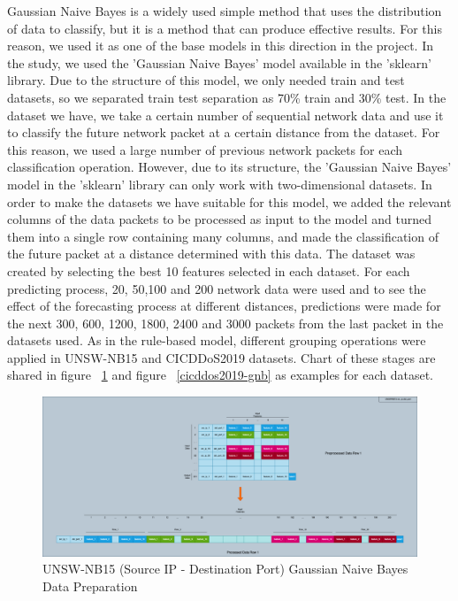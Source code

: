 \documentclass{article}
\begin{document}
Gaussian Naive Bayes is a widely used simple method that uses the distribution of data to classify, but it is a method that can produce effective results. For this reason, we used it as one of the base models in this direction in the project. In the study, we used the 'Gaussian Naive Bayes' model available in the 'sklearn' library. Due to the structure of this model, we only needed train and test datasets, so we separated train test separation as 70\% train and 30\% test. In the dataset we have, we take a certain number of sequential network data and use it to classify the future network packet at a certain distance from the dataset. For this reason, we used a large number of previous network packets for each classification operation. However, due to its structure, the 'Gaussian Naive Bayes' model in the 'sklearn' library can only work with two-dimensional datasets. In order to make the datasets we have suitable for this model, we added the relevant columns of the data packets to be processed as input to the model and turned them into a single row containing many columns, and made the classification of the future packet at a distance determined with this data. The dataset was created by selecting the best 10 features selected in each dataset. For each predicting process, 20, 50,100 and 200 network data were used and to see the effect of the forecasting process at different distances, predictions were made for the next 300, 600, 1200, 1800, 2400 and 3000 packets from the last packet in the datasets used. As in the rule-based model, different grouping operations were applied in UNSW-NB15 and CICDDoS2019 datasets. Chart of these stages are shared in figure ~\ref{unswnb15-gnb} and figure ~\ref{cicddos2019-gnb} as examples for each dataset.

\begin{figure}
  \centering
  \includegraphics[width=\textwidth]{unswnb15_gnb.png}
  \caption{UNSW-NB15 (Source IP - Destination Port) Gaussian Naive Bayes Data Preparation}
  \label{unswnb15-gnb}
\end{figure}
\end{document}
